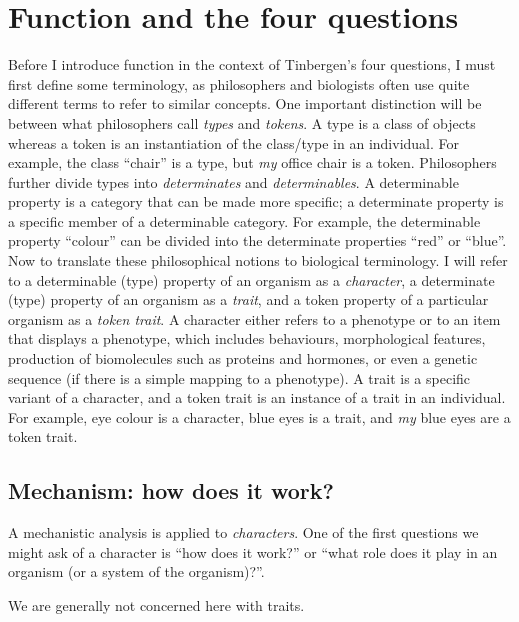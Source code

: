 \documentclass{article}
\begin{document}
\section{Function and the four questions}
\label{sec:funct-tinb-four}

Before I introduce function in the context of Tinbergen's four questions, I must first define some terminology, as philosophers and biologists often use quite different terms to refer to similar concepts.
One important distinction will be between what philosophers call \emph{types} and \emph{tokens}.
A type is a class of objects whereas a token is an instantiation of the class/type in an individual.
For example, the class ``chair'' is a type, but \emph{my} office chair is a token.
Philosophers further divide types into \emph{determinates} and \emph{determinables}.
A determinable property is a category that can be made more specific; a determinate property is a specific member of a determinable category. 
For example, the determinable property ``colour'' can be divided into the determinate properties ``red'' or ``blue''.
Now to translate these philosophical notions to biological terminology.
I will refer to a determinable (type) property of an organism as a \emph{character}, a determinate (type) property of an organism as a \emph{trait}, and a token property of a particular organism as a \emph{token trait}.
A character either refers to a phenotype or to an item that displays a phenotype, which includes behaviours, morphological features, production of biomolecules such as proteins and hormones, or even a genetic sequence (if there is a simple mapping to a phenotype).
A trait is a specific variant of a character, and a token trait is an instance of a trait in an individual.
For example, eye colour is a character, blue eyes is a trait, and \emph{my} blue eyes are a token trait.

\subsection{Mechanism: how does it work?}
\label{sec:mechanism}

A mechanistic analysis is applied to \emph{characters}.
One of the first questions we might ask of a character is ``how does it work?'' or ``what role does it play in an organism (or a system of the organism)?''.

We are generally not concerned here with traits.
\end{document}
